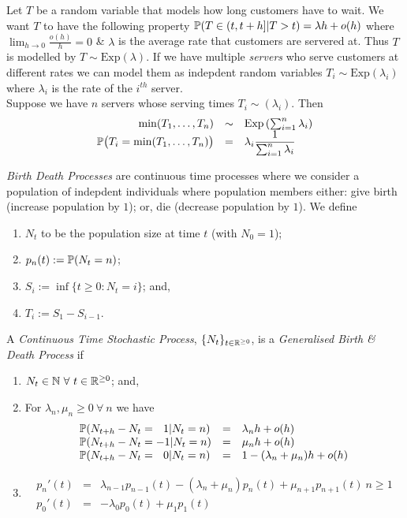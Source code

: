 \documentclass[11pt,a4paper]{article}
\begin{document}
Let $T$ be a random variable that models how long customers have to wait. We want $T$ to have the following property $\mathbb{P}(T\in(t,t+h]|T>t)=\lambda h+o(h)$ where $\lim_{h\to0}\frac{o(h)}{h}=0$ \& $\lambda$ is the average rate that customers are servered at. Thus $T$ is modelled by $T\sim\mathrm{Exp}(\lambda)$. If we have multiple \textit{servers} who serve customers at different rates we can model them as indepdent random variables $T_i\sim\mathrm{Exp}(\lambda_i)$ where $\lambda_i$ is the rate of the $i^{th}$ server.\\

Suppose we have $n$ servers whose serving times $T_i\sim(\lambda_i)$. Then
\[\begin{array}{rcl}
\min(T_1,\dots,T_n)&\sim&\mathrm{Exp}\left(\sum_{i=1}^n\lambda_i\right)\\
\mathbb{P}\big(T_i=\min(T_1,\dots,T_n)\big)&=&\lambda_i\dfrac{1}{\sum_{i=1}^n\lambda_i}
\end{array}\]

\textit{Birth Death Processes} are continuous time processes where we consider a population of indepdent individuals where population members either: give birth (increase population by $1$); or, die (decrease population by $1$). We define
\begin{enumerate}
	\item $N_t$ to be the population size at time $t$ (with $N_0=1$);
	\item $p_n(t):=\mathbb{P}(N_t=n)$;
	\item $S_i:=\inf\{t\geq0:N_t=i\}$; and,
	\item $T_i:=S_1-S_{i-1}$.
\end{enumerate}

A \textit{Continuous Time Stochastic Process}, $\{N_t\}_{t\in\mathbb{R}^{\geq0}}$, is a \textit{Generalised Birth \& Death Process} if
\begin{enumerate}
	\item $N_t\in\nats\ \forall\ t\in\reals^{\geq0}$; and,
	\item For $\lambda_n,\mu_n\geq0\ \forall\ n$ we have
	\[\begin{array}{lcl}
	\mathbb{P}(N_{t+h}-N_t=\ \ 1|N_t=n)&=&\lambda_nh+o(h)\\
	\mathbb{P}(N_{t+h}-N_t=-1|N_t=n)&=&\mu_nh+o(h)\\
	\mathbb{P}(N_{t+h}-N_t=\ \ 0|N_t=n)&=&1-(\lambda_n+\mu_n)h+o(h)
	\end{array}\]
	\item \[\begin{array}{rcl}
	p_n'(t)&=&\lambda_{n-1}p_{n-1}(t)-(\lambda_n+\mu_n)p_n(t)+\mu_{n+1}p_{n+1}(t)\ n\geq1\\
	p_0'(t)&=&-\lambda_0p_0(t)+\mu_1p_1(t)
	\end{array}\]
\end{enumerate}
\end{document}
